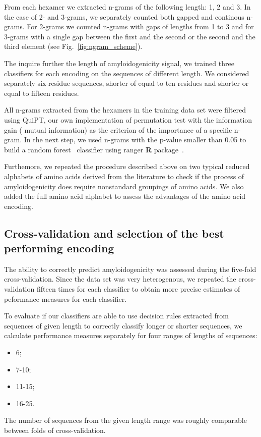 \documentclass{bioinfo}
\begin{document}
\begin{methods}
  From each hexamer we extracted n-grams of the following length: 1, 2 and 3. In 
the case of 2- and 3-grams, we separately counted both gapped and continous 
n-grams. For 2-grams we counted n-grams with gaps of lengths from 1 to 3 and for 
3-grams with a single gap between the first and the second or the second and the 
third element (see Fig.~\ref{fig:ngram_scheme}).

  The inquire further the length of amyloidogenicity signal, we trained three 
classifiers for each encoding on the sequences of different length. We 
considered separately six-residue sequences, shorter of equal to ten residues 
and shorter or equal to fifteen residues.

  All n-grams extracted from the hexamers in the training data set were filtered 
using QuiPT, our own implementation of permutation test with the information 
gain ( mutual information) as the criterion of the importance of a specific 
n-gram. In the next step, we used n-grams with the p-value smaller than 0.05 to 
build a random forest~\citep{breiman_random_2001} classifier using ranger 
\textbf{R} package~\citep{wright_ranger:_2015}. 

  Furthemore, we repeated the procedure described above on two typical reduced 
alphabets of amino acids derived from the literature to check if the process of 
amyloidogenicity does require nonstandard groupings of amino acids. We also 
added the full amino acid alphabet to assess the advantages of the amino acid 
encoding.

\subsection{Cross-validation and selection of the best performing encoding}

The ability to correctly predict amyloidogenicity was assessed during the 
five-fold cross-validation. Since the data set was very heterogenous,  we 
repeated the cross-validation fifteen times for each classifier to obtain more 
precise estimates of peformance measures for each classifier. 

  To evaluate if our classifiers are able to use decision rules extracted from 
sequences of given length to correctly classify longer or shorter sequences, we 
calculate performance measures separately for four ranges of lengths of 
sequences:  
  \begin{itemize}
  \item 6;  
  \item 7-10;   
  \item 11-15;   
  \item 16-25.  
  \end{itemize}
  The number of sequences from the given length range was roughly comparable 
between folds of cross-validation.


\end{methods}
\end{document}
